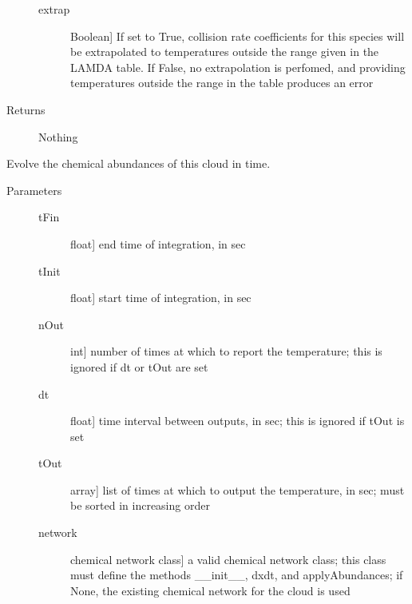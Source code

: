 \documentclass[letterpaper,10pt,english]{sphinxmanual}
\begin{document}
\begin{fulllineitems}
\begin{fulllineitems}
\begin{description}
\begin{description}
\item[{extrap}] \leavevmode{[}Boolean{]}
If set to True, collision rate coefficients for this species
will be extrapolated to temperatures outside the range given
in the LAMDA table. If False, no extrapolation is perfomed,
and providing temperatures outside the range in the table
produces an error

\end{description}

\item[{Returns}] \leavevmode
Nothing

\end{description}

\end{fulllineitems}


\begin{fulllineitems}
\label{fulldoc:despotic.cloud.chemEvol}
Evolve the chemical abundances of this cloud in time.
\begin{description}
\item[{Parameters}] \leavevmode\begin{description}
\item[{tFin}] \leavevmode{[}float{]}
end time of integration, in sec

\item[{tInit}] \leavevmode{[}float{]}
start time of integration, in sec

\item[{nOut}] \leavevmode{[}int{]}
number of times at which to report the temperature; this
is ignored if dt or tOut are set

\item[{dt}] \leavevmode{[}float{]}
time interval between outputs, in sec; this is ignored if
tOut is set

\item[{tOut}] \leavevmode{[}array{]}
list of times at which to output the temperature, in sec;
must be sorted in increasing order

\item[{network}] \leavevmode{[}chemical network class{]}
a valid chemical network class; this class must define the
methods \_\_init\_\_, dxdt, and applyAbundances; if None, the
existing chemical network for the cloud is used


\end{description}
\end{description}
\end{fulllineitems}
\end{fulllineitems}
\end{document}
